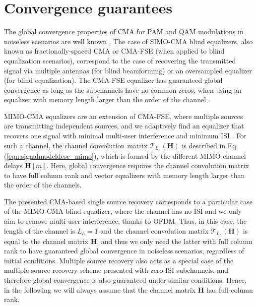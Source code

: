 \section{Convergence guarantees}
The global convergence properties of CMA for PAM and QAM modulations in noiseless scenarios are well known \cite[Chapters 4, 7]{Ding2000}.  The case of SIMO-CMA blind equalizers, also known as fractionally-spaced CMA or CMA-FSE (when applied to blind equalization scenarios), correspond to the case of recovering the transmitted signal via multiple antennas (for blind beamforming) or an oversampled equalizer (for blind equalization). The CMA-FSE equalizer has guaranteed global convergence as long as the subchannels have no common zeros, when using an equalizer with memory length larger than the order of the channel \cite{LiDing1994cmaglobalconvergencefse}.

MIMO-CMA equalizers are an extension of CMA-FSE, where multiple sources are transmitting independent sources, and we adaptively find an equalizer that recovers one signal with minimal multi-user interference and minimum ISI \cite{Mayrargue1994mimocma,Li1998adaptivemimocma}. For such a channel, the channel convolution matrix $\mathcal{T}_{L_h}(\bm{H})$ is described in Eq.(\ref{eqn:signalmodeldesc_mimo}), which is formed by the different MIMO-channel delays $\bm{H}[m]$. Here, global convergence requires the channel convolution matrix to have full column rank and vector equalizers with memory length larger than the order of the channels.
 
The presented CMA-based single source recovery corresponds to a particular case of the MIMO-CMA blind equalizer, where the channel has no ISI and we only aim to remove multi-user interference, thanks to OFDM. Thus, in this case, the length of the channel is $L_h=1$ and the channel convolution matrix $\mathcal{T}_{L_h}(\bm{H})$ is equal to the channel matrix $\bm{H}$, and thus we only need the latter with full column rank to have guaranteed global convergence in noiseless scenarios, regardless of initial conditions. Multiple source recovery also acts as a special case of the multiple source recovery scheme presented \cite{Li1998adaptivemimocma} with zero-ISI subchannels, and therefore global convergence is also guaranteed under similar conditions. Hence, in the following we will always assume that the channel matrix $\bm{H}$ has full-column rank.



